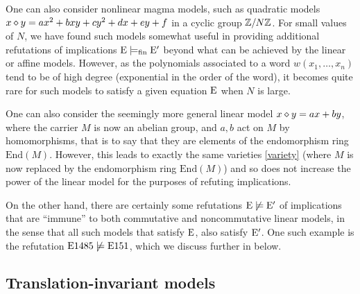 \begin{remark}  One can also consider nonlinear magma models, such as quadratic models $x \diamond y = ax^2 + bxy + cy^2 + dx + ey + f$ in a cyclic group $\mathbb{Z}/N\mathbb{Z}$.  For small values of $N$, we have found such models somewhat useful in providing additional refutations of implications $\mathrm{E} \models_{\mathrm{fin}} {\mathrm{E}'}$ beyond what can be achieved by the linear or affine models.  However, as the polynomials associated to a word $w(x_1,\dots,x_n)$ tend to be of high degree (exponential in the order of the word), it becomes quite rare for such models to satisfy a given equation $\mathrm{E}$ when $N$ is large.
\end{remark}

\begin{remark} One can also consider the seemingly more general linear model $x \diamond y = ax + by$, where the carrier $M$ is now an abelian group, and $a,b$ act on $M$ by homomorphisms, that is to say that they are elements of the endomorphism ring $\mathrm{End}(M)$.  However, this leads to exactly the same varieties \eqref{variety} (where $M$ is now replaced by the endomorphism ring $\mathrm{End}(M)$) and so does not increase the power of the linear model for the purposes of refuting implications.
\end{remark}

On the other hand, there are certainly some refutations $\mathrm{E} \not\models {\mathrm{E}'}$ of implications that are ``immune'' to both commutative and noncommutative linear models, in the sense that all such models that satisfy $\mathrm{E}$, also satisfy ${\mathrm{E}'}$.  One such example is the refutation $\mathrm{E}1485 \not \models \mathrm{E}151$, which we discuss further in  below.

\subsection{Translation-invariant models}\label{translation-sec}

